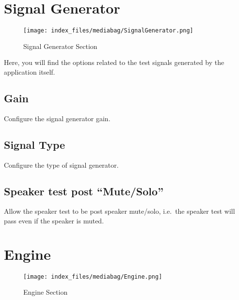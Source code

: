 \documentclass[
  letterpaper,
  DIV=11,
  numbers=noendperiod]{scrreport}
\begin{document}
\hypertarget{signal-generator}{%
\section{Signal Generator}\label{signal-generator}}

\begin{figure}

{\centering \texttt{[image: index\_files/mediabag/SignalGenerator.png]}

}

\caption{Signal Generator Section}

\end{figure}

Here, you will find the options related to the test signals generated by
the application itself.

\hypertarget{gain-2}{%
\subsection{Gain}\label{gain-2}}

Configure the signal generator gain.

\hypertarget{signal-type}{%
\subsection{Signal Type}\label{signal-type}}

Configure the type of signal generator.

\hypertarget{speaker-test-post-mutesolo-1}{%
\subsection{Speaker test post
``Mute/Solo''}\label{speaker-test-post-mutesolo-1}}

Allow the speaker test to be post speaker mute/solo, i.e.~the speaker
test will pass even if the speaker is muted.

\hypertarget{engine}{%
\section{Engine}\label{engine}}

\begin{figure}

{\centering \texttt{[image: index\_files/mediabag/Engine.png]}

}

\caption{Engine Section}

\end{figure}
\end{document}
